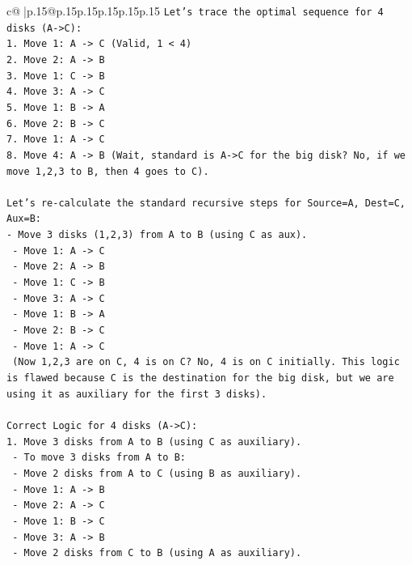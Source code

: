 \documentclass{article}
\begin{document}
{\begin{supertabular}{c@{$\;$}|p{.15\linewidth}@{}p{.15\linewidth}p{.15\linewidth}p{.15\linewidth}p{.15\linewidth}p{.15\linewidth}}
{{{\texttt{Let's trace the optimal sequence for 4 disks (A{-}>C):} \\
\texttt{1. Move 1: A {-}> C (Valid, 1 < 4)} \\
\texttt{2. Move 2: A {-}> B} \\
\texttt{3. Move 1: C {-}> B} \\
\texttt{4. Move 3: A {-}> C} \\
\texttt{5. Move 1: B {-}> A} \\
\texttt{6. Move 2: B {-}> C} \\
\texttt{7. Move 1: A {-}> C} \\
\texttt{8. Move 4: A {-}> B (Wait, standard is A{-}>C for the big disk? No, if we move 1,2,3 to B, then 4 goes to C).} \\
\\ 
\texttt{Let's re{-}calculate the standard recursive steps for Source=A, Dest=C, Aux=B:} \\
\texttt{{-} Move 3 disks (1,2,3) from A to B (using C as aux).} \\
\texttt{  {-} Move 1: A {-}> C} \\
\texttt{  {-} Move 2: A {-}> B} \\
\texttt{  {-} Move 1: C {-}> B} \\
\texttt{  {-} Move 3: A {-}> C} \\
\texttt{  {-} Move 1: B {-}> A} \\
\texttt{  {-} Move 2: B {-}> C} \\
\texttt{  {-} Move 1: A {-}> C} \\
\texttt{  (Now 1,2,3 are on C, 4 is on C? No, 4 is on C initially. This logic is flawed because C is the destination for the big disk, but we are using it as auxiliary for the first 3 disks).} \\
\\ 
\texttt{Correct Logic for 4 disks (A{-}>C):} \\
\texttt{1. Move 3 disks from A to B (using C as auxiliary).} \\
\texttt{   {-} To move 3 disks from A to B:} \\
\texttt{     {-} Move 2 disks from A to C (using B as auxiliary).} \\
\texttt{       {-} Move 1: A {-}> B} \\
\texttt{       {-} Move 2: A {-}> C} \\
\texttt{       {-} Move 1: B {-}> C} \\
\texttt{     {-} Move 3: A {-}> B} \\
\texttt{     {-} Move 2 disks from C to B (using A as auxiliary).} \\
}}}
\end{supertabular}}
\end{document}
